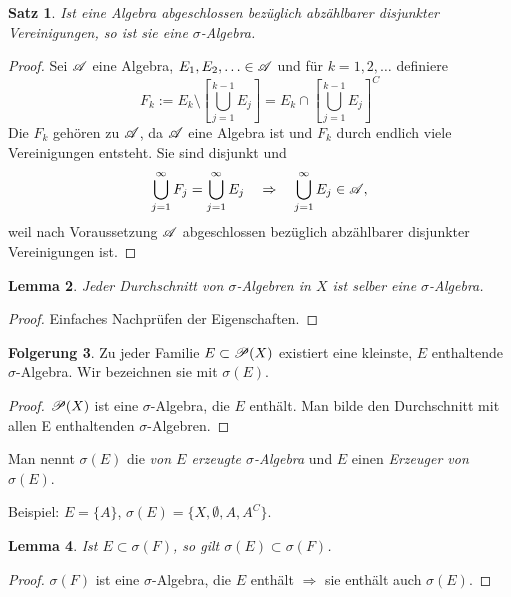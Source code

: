 \documentclass[
 a4paper,
 12pt,
 parskip=half
 ]{scrreprt}
\theoremstyle{plain}
\newtheorem{thm}{Satz}[section] %
\newtheorem{lem}[thm]{Lemma}
\theoremstyle{definition}
\newtheorem{folg}[thm]{Folgerung} %
\numberwithin{equation}{section}
\begin{document}
\begin{thm}
 Ist eine Algebra abgeschlossen bezüglich abzählbarer \emph{disjunkter} Vereinigungen, so ist sie eine $\sigma$-Algebra.
\end{thm}

\begin{proof}
 Sei $\mathscr{A}$ eine Algebra, $E_1, E_2, \ldots \in \mathscr{A}$ und für $k = 1, 2, \ldots$ definiere
 \[ F_k := E_k \setminus \left[ \bigcup_{j=1}^{k-1} E_j \right] = E_k \cap \left[ \bigcup_{j=1}^{k-1} E_j \right]^C \]
 Die $F_k$ gehören zu $\mathscr{A}$, da $\mathscr{A}$ eine Algebra ist und $F_k$ durch endlich viele Vereinigungen entsteht. Sie sind disjunkt und
 \[ \bigcup_{j=1}^\infty F_j = \bigcup_{j=1}^\infty E_j \quad \Rightarrow \quad \bigcup_{j=1}^\infty E_j \in \mathscr{A}, \]
 weil nach Voraussetzung $\mathscr{A}$ abgeschlossen bezüglich abzählbarer disjunkter Vereinigungen ist.
\end{proof}

\begin{lem}
 Jeder Durchschnitt von $\sigma$-Algebren in $X$ ist selber eine $\sigma$-Algebra.
\end{lem}

\begin{proof}
 Einfaches Nachprüfen der Eigenschaften.
\end{proof}

\begin{folg}
 Zu jeder Familie $E \subset \mathscr{P}(X)$ existiert eine kleinste, $E$ enthaltende $\sigma$-Algebra. Wir bezeichnen sie mit $\sigma(E)$.
\end{folg}

\begin{proof}
 $\mathscr{P}(X)$ ist eine $\sigma$-Algebra, die $E$ enthält. Man bilde den Durchschnitt mit allen E enthaltenden $\sigma$-Algebren.
\end{proof}

Man nennt $\sigma(E)$ die \emph{von $E$ erzeugte $\sigma$-Algebra} und $E$ einen \emph{Erzeuger von $\sigma(E)$}.

Beispiel: $E = \{A\}$, $\sigma(E) = \{ X, \emptyset, A, A^C \}$.

\begin{lem}
 Ist $E \subset \sigma(F)$, so gilt $\sigma(E) \subset \sigma(F)$.
\end{lem}

\begin{proof}
 $\sigma(F)$ ist eine $\sigma$-Algebra, die $E$ enthält $\Rightarrow$ sie enthält auch $\sigma(E)$.
\end{proof}
\end{document}
